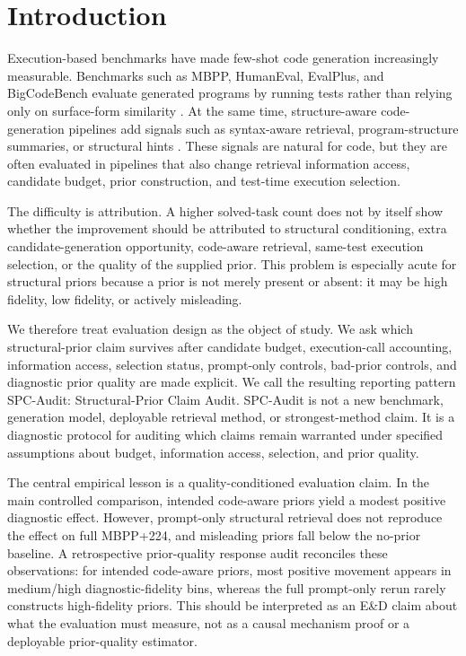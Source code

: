 \documentclass{article}
\begin{document}
\section{Introduction}
Execution-based benchmarks have made few-shot code generation increasingly measurable. Benchmarks such as MBPP, HumanEval, EvalPlus, and BigCodeBench evaluate generated programs by running tests rather than relying only on surface-form similarity \citep{austin2021program,chen2021evaluating,liu2023evalplus,zhuo2024bigcodebench}. At the same time, structure-aware code-generation pipelines add signals such as syntax-aware retrieval, program-structure summaries, or structural hints \citep{zhang2023syntax,tipirneni2022structcoder}. These signals are natural for code, but they are often evaluated in pipelines that also change retrieval information access, candidate budget, prior construction, and test-time execution selection.

The difficulty is attribution. A higher solved-task count does not by itself show whether the improvement should be attributed to structural conditioning, extra candidate-generation opportunity, code-aware retrieval, same-test execution selection, or the quality of the supplied prior. This problem is especially acute for structural priors because a prior is not merely present or absent: it may be high fidelity, low fidelity, or actively misleading.

We therefore treat evaluation design as the object of study. We ask which structural-prior claim survives after candidate budget, execution-call accounting, information access, selection status, prompt-only controls, bad-prior controls, and diagnostic prior quality are made explicit. We call the resulting reporting pattern SPC-Audit: Structural-Prior Claim Audit. SPC-Audit is not a new benchmark, generation model, deployable retrieval method, or strongest-method claim. It is a diagnostic protocol for auditing which claims remain warranted under specified assumptions about budget, information access, selection, and prior quality.

The central empirical lesson is a quality-conditioned evaluation claim. In the main controlled comparison, intended code-aware priors yield a modest positive diagnostic effect. However, prompt-only structural retrieval does not reproduce the effect on full MBPP+224, and misleading priors fall below the no-prior baseline. A retrospective prior-quality response audit reconciles these observations: for intended code-aware priors, most positive movement appears in medium/high diagnostic-fidelity bins, whereas the full prompt-only rerun rarely constructs high-fidelity priors. This should be interpreted as an E\&D claim about what the evaluation must measure, not as a causal mechanism proof or a deployable prior-quality estimator.
\end{document}
